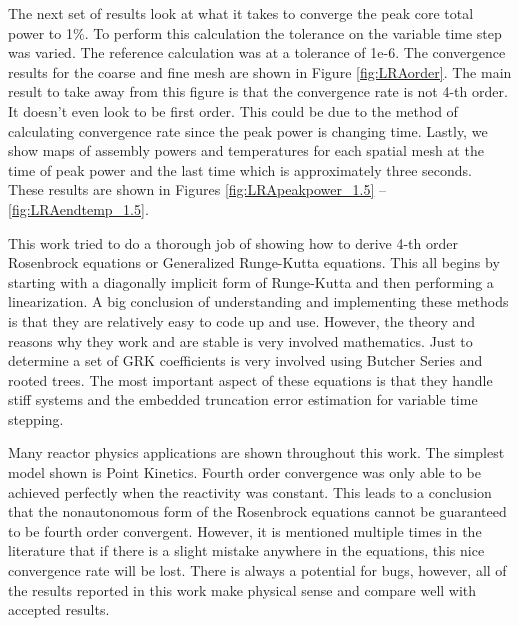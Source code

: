 \documentclass{ansconf}
\numberwithin{equation}{section}
\begin{document}
The next set of results look at what it takes to converge the peak core total power to 1\%. To perform this calculation the tolerance on the variable time step was varied. The reference calculation was at a tolerance of 1e-6. The convergence results for the coarse and fine mesh are shown in Figure \ref{fig:LRAorder}. The main result to take away from this figure is that the convergence rate is not 4-th order. It doesn't even look to be first order. This could be due to the method of calculating convergence rate since the peak power is changing time. Lastly, we show maps of assembly powers and temperatures for each spatial mesh at the time of peak power and the last time which is approximately three seconds. These results are shown in Figures \ref{fig:LRApeakpower_1.5} -- \ref{fig:LRAendtemp_1.5}.










This work tried to do a thorough job of showing how to derive 4-th order Rosenbrock equations or Generalized Runge-Kutta equations. This all begins by starting with a diagonally implicit form of Runge-Kutta and then performing a linearization. A big conclusion of understanding and implementing these methods is that they are relatively easy to code up and use. However, the theory and reasons why they work and are stable is very involved mathematics. Just to determine a set of GRK coefficients is very involved using Butcher Series and rooted trees. The most important aspect of these equations is that they handle stiff systems and the embedded truncation error estimation for variable time stepping.

Many reactor physics applications are shown throughout this work. The simplest model shown is Point Kinetics. Fourth order convergence was only able to be achieved perfectly when the reactivity was constant. This leads to a conclusion that the nonautonomous form of the Rosenbrock equations cannot be guaranteed to be fourth order convergent. However, it is mentioned multiple times in the literature that if there is a slight mistake anywhere in the equations, this nice convergence rate will be lost. There is always a potential for bugs, however, all of the results reported in this work make physical sense and compare well with accepted results.
\end{document}
